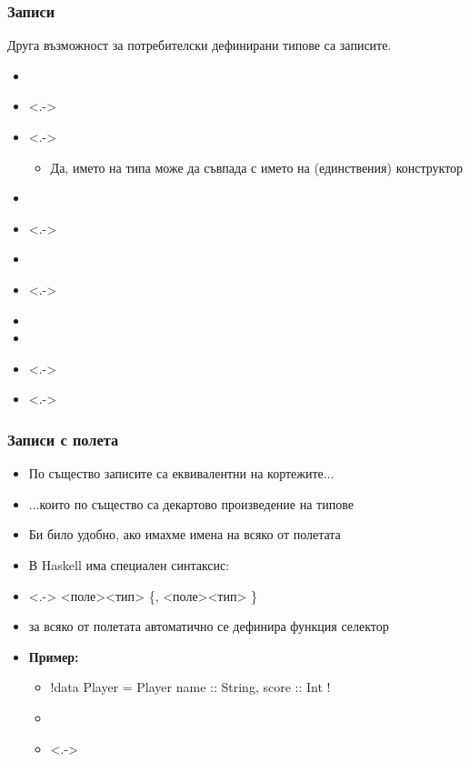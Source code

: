 \documentclass[alsotrans]{beamerswitch}
\begin{document}
\begin{frame}
  \frametitle{Записи}
  Друга възможност за потребителски дефинирани типове са \alert{записите}.\\
  \pause
  \begin{itemize}[<+->]
  \item {}
  \item<.-> 
  \item<.-> 
    \begin{itemize}
    \item Да, името на типа може да съвпада с името на (единствения) конструктор
    \end{itemize}
  \item {}
  \item<.-> 
  \item {}
  \item<.-> 
  \item {}
  \item {}
  \item<.-> \hspace{2ex}
  \item<.-> \hspace{2ex}
  \end{itemize}
\end{frame}

\begin{frame}[fragile]
  \frametitle{Записи с полета}
  \begin{itemize}[<+->]
  \item По същество записите са еквивалентни на кортежите...
  \item ...които по същество са декартово произведение на типове
  \item Би било удобно, ако имахме имена на всяко от полетата
  \item В Haskell има специален синтаксис:
  \item<.-> \tta{\{} <поле>\tta{::}<тип> \{, <поле>\tta{::}<тип> \}\tta{\}}
  \item за всяко от полетата автоматично се дефинира функция селектор
  \item \textbf{Пример:}
    \begin{itemize}
    \item \lst!data Player = Player { name :: String, score :: Int }!
    \item {}
    \item<.-> 
    \end{itemize}
  \end{itemize}
\end{frame}
\end{document}
